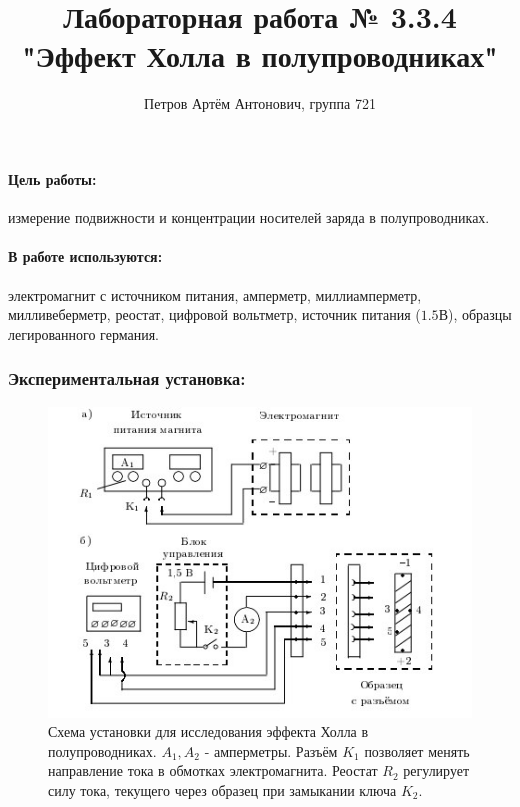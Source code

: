 \documentclass{article}
\author{Петров Артём Антонович, группа 721}
\title{Лабораторная работа № 3.3.4 "Эффект Холла в полупроводниках"}
\begin{document}
   
\begin{minipage}[t][4cm]{\textwidth}
\maketitle
\end{minipage}   
   
   \paragraph{Цель работы:} измерение подвижности и концентрации носителей заряда в полупроводниках.
   
   \paragraph{В работе используются:} электромагнит с источником питания, амперметр, миллиамперметр, милливеберметр, реостат, цифровой вольтметр, источник питания ($1.5$В), образцы легированного германия.
   
   \subsubsection*{Экспериментальная установка:}
   
   \begin{figure}[h]
   \centering
   \includegraphics[width=15cm]{3_3_4.jpg} 
   \caption{Схема установки для исследования эффекта Холла в полупроводниках. $A_1, A_2$ - амперметры. Разъём $K_1$  позволяет менять направление тока в обмотках электромагнита. Реостат $R_2$ регулирует силу тока, текущего через образец при замыкании ключа $K_2$.}
   \label{fig.1} 
   \end{figure}
\end{document}
